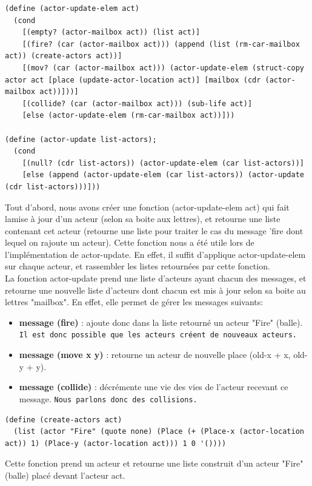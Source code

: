 \documentclass[a4paper]{article}
\begin{document}
\begin{lstlisting}
(define (actor-update-elem act)
  (cond
    [(empty? (actor-mailbox act)) (list act)]
    [(fire? (car (actor-mailbox act))) (append (list (rm-car-mailbox act)) (create-actors act))]  
    [(mov? (car (actor-mailbox act))) (actor-update-elem (struct-copy actor act [place (update-actor-location act)] [mailbox (cdr (actor-mailbox act))]))]
    [(collide? (car (actor-mailbox act))) (sub-life act)]
    [else (actor-update-elem (rm-car-mailbox act))]))
    
(define (actor-update list-actors);
  (cond
    [(null? (cdr list-actors)) (actor-update-elem (car list-actors))]
    [else (append (actor-update-elem (car list-actors)) (actor-update (cdr list-actors)))]))
\end{lstlisting}
Tout d'abord, nous avons créer une fonction (actor-update-elem act) qui fait lamise à jour d'un acteur (selon sa boite aux lettres), et retourne une liste contenant cet acteur (retourne une liste pour traiter le cas du message 'fire dont lequel on rajoute un acteur). Cette fonction nous a été utile lors de l'implémentation de actor-update. En effet, il suffit d'applique actor-update-elem sur chaque acteur, et rassembler les listes retournées par cette fonction.
\\La fonction actor-update prend une liste d'acteurs ayant chacun des messages, et retourne une nouvelle liste d'acteurs dont chacun est mis à jour selon sa boite au lettres "mailbox".
\newline En effet, elle permet de gérer les messages suivants:
\begin{itemize}
    \item \textbf{message (fire)} : ajoute donc dans la liste retourné un acteur "Fire" (balle). \texttt{Il est donc possible que les acteurs créent de nouveaux acteurs.}
    \item \textbf{message (move x y)} : retourne un acteur de nouvelle place (old-x + x, old-y + y).
    \item \textbf{message (collide)} : décrémente une vie des vies de l'acteur recevant ce message. \texttt{Nous parlons donc des collisions.}
\end{itemize}

\begin{lstlisting}
(define (create-actors act)
  (list (actor "Fire" (quote none) (Place (+ (Place-x (actor-location act)) 1) (Place-y (actor-location act))) 1 0 '())))
\end{lstlisting}
Cette fonction prend un acteur et retourne une liste construit d'un acteur "Fire" (balle) placé devant l'acteur act.
\end{document}
